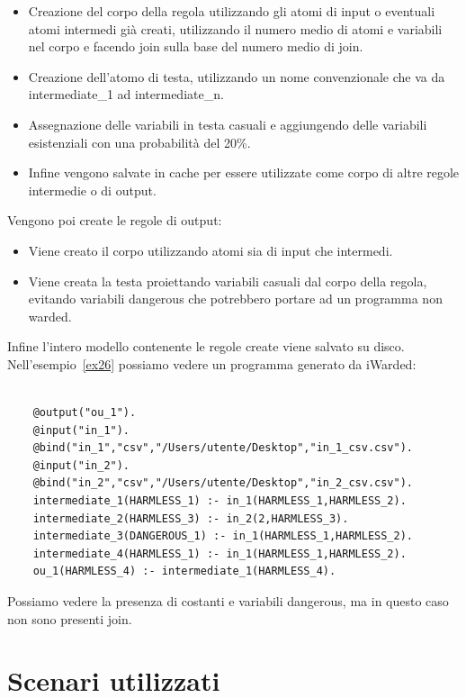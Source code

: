 \begin{itemize}
	\item Creazione del corpo della regola utilizzando gli atomi di input o eventuali atomi intermedi già creati, utilizzando il numero medio di atomi e variabili nel corpo e facendo join sulla base del numero medio di join.
	\item Creazione dell'atomo di testa, utilizzando un nome convenzionale che va da intermediate\_1 ad intermediate\_n.
	\item Assegnazione delle variabili in testa casuali e aggiungendo delle variabili esistenziali con una probabilità del 20\%.
	\item Infine vengono salvate in cache per essere utilizzate come corpo di altre regole intermedie o di output.
\end{itemize}
Vengono poi create le regole di output:
\begin{itemize}
	\item Viene creato il corpo utilizzando atomi sia di input che intermedi.
	\item Viene creata la testa proiettando variabili casuali dal corpo della regola, evitando variabili dangerous che potrebbero portare ad un programma non warded.
\end{itemize}
Infine l'intero modello contenente le regole create viene salvato su disco. \newline
Nell'esempio~\ref{ex26} possiamo vedere un programma generato da iWarded:
\begin{example}\label{ex26}
	\scriptsize \begin{lstlisting}
	
	@output("ou_1").
	@input("in_1").
	@bind("in_1","csv","/Users/utente/Desktop","in_1_csv.csv").
	@input("in_2").
	@bind("in_2","csv","/Users/utente/Desktop","in_2_csv.csv").
	intermediate_1(HARMLESS_1) :- in_1(HARMLESS_1,HARMLESS_2).
	intermediate_2(HARMLESS_3) :- in_2(2,HARMLESS_3).
	intermediate_3(DANGEROUS_1) :- in_1(HARMLESS_1,HARMLESS_2).
	intermediate_4(HARMLESS_1) :- in_1(HARMLESS_1,HARMLESS_2).
	ou_1(HARMLESS_4) :- intermediate_1(HARMLESS_4).
	\end{lstlisting}
\end{example}
Possiamo vedere la presenza di costanti e variabili dangerous, ma in questo caso non sono presenti join. 

\section{Scenari utilizzati}

